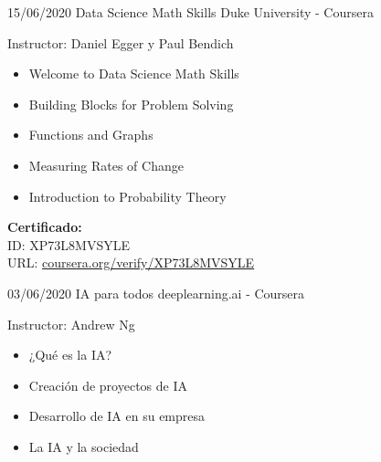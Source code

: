 \begin{entrylist}
    \entry
		{15/06/2020}
		{Data Science Math Skills}
		{Duke University - Coursera}
		{
		    Instructor: Daniel Egger y Paul Bendich \\
		    \vspace{-5mm}
    	    \begin{itemize}
    	        \setlength\itemsep{0pt}
    	        \setlength\parskip{0pt}
    	        \item Welcome to Data Science Math Skills
    	        \item Building Blocks for Problem Solving
    	        \item Functions and Graphs
    	        \item Measuring Rates of Change
    	        \item Introduction to Probability Theory
            \end{itemize}
            
            \textbf{Certificado:} \\
            ID: XP73L8MVSYLE \\
            URL: {\href{https://coursera.org/verify/XP73L8MVSYLE}{coursera.org/verify/XP73L8MVSYLE}}
		}
    \entry
		{03/06/2020}
		{IA para todos}
		{deeplearning.ai - Coursera}
		{
		    Instructor: Andrew Ng \\
		    \vspace{-5mm}
    	    \begin{itemize}
    	        \setlength\itemsep{0pt}
    	        \setlength\parskip{0pt}
    	        \item ¿Qué es la IA?
    	        \item Creación de proyectos de IA
    	        \item Desarrollo de IA en su empresa
    	        \item La IA y la sociedad
            \end{itemize}
            
}
\end{entrylist}
